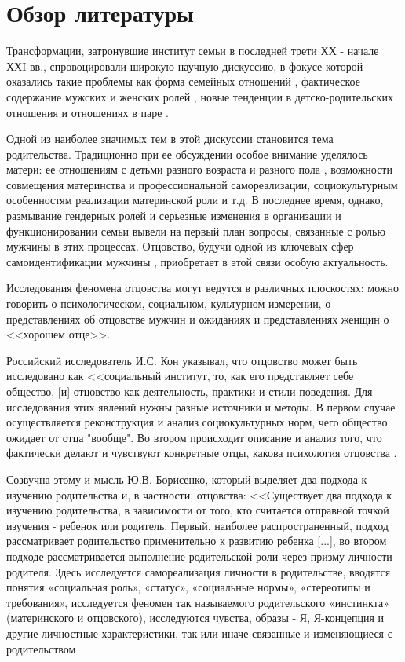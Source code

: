 \documentclass{../../common/thesisbyxetex}
\begin{document}
\chapter{Обзор литературы}

Трансформации, затронувшие институт семьи в последней трети ХХ - начале ХХI вв.,  спровоцировали 
широкую научную дискуссию, в фокусе которой оказались такие проблемы как форма семейных 
отношений \cite{gay, legfat}, фактическое содержание мужских и женских ролей \cite{mercoh, percep}, 
новые тенденции в детско-родительских отношения и отношениях в паре \cite{relot, sex}.

Одной из наиболее значимых тем в этой дискуссии становится тема родительства. Традиционно при ее 
обсуждении особое внимание уделялось матери: ее отношениям с детьми разного возраста и разного 
пола \cite{maler}, возможности совмещения материнства и профессиональной самореализации, 
социокультурным особенностям реализации материнской роли и т.д. В последнее время, однако, 
размывание гендерных ролей и серьезные изменения в организации и функционировании семьи 
вывели на первый план вопросы, связанные с ролью мужчины в этих процессах. Отцовство, будучи одной 
из ключевых сфер самоидентификации мужчины \cite{imaf}, приобретает в этой связи особую 
актуальность.

Исследования феномена отцовства могут ведутся  в различных плоскостях: можно говорить о 
психологическом, социальном, культурном измерении, о представлениях об отцовстве мужчин и ожиданиях 
и представлениях женщин о <<хорошем отце>>.

Российский исследователь И.С. Кон указывал, что отцовство может быть исследовано как <<социальный 
институт, то, как его представляет себе общество, [и] отцовство как деятельность, практики и 
стили поведения. Для исследования этих явлений нужны разные источники и методы. В первом случае 
осуществляется реконструкция и анализ социокультурных норм, чего общество ожидает от отца "вообще". 
Во втором происходит описание и анализ того, что фактически делают и чувствуют конкретные отцы, 
какова психология отцовства \cite[3]{konot}.

Созвучна этому и мысль Ю.В. Борисенко, который выделяет два подхода к изучению родительства и, в 
частности, отцовства: <<Существует два подхода к изучению родительства, в зависимости от того, кто 
считается отправной точкой изучения - ребенок или родитель. Первый, наиболее распространенный, 
подход рассматривает родительство применительно к развитию ребенка [...], во втором подходе 
рассматривается выполнение родительской роли через призму личности родителя. Здесь исследуется 
самореализация личности в родительстве, вводятся понятия «социальная роль», «статус», «социальные 
нормы», «стереотипы и требования», исследуется феномен так называемого родительского «инстинкта»
(материнского и отцовского), исследуются чувства, образы - Я, Я-концепция и другие личностные 
характеристики, так или иначе связанные и изменяющиеся с родительством \cite[11]{psyot}
\end{document}
